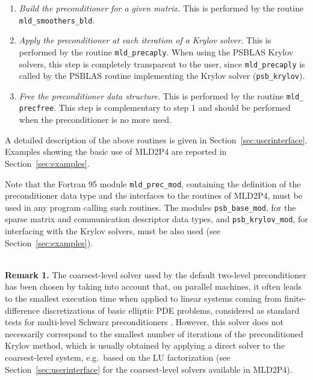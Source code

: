 \begin{enumerate}
{  preconditioner parameters.} This is performed by the routine \verb|mld_precset|.
  This routine must be called only if the user wants to modify the default values
  of the parameters associated to the selected preconditioner type, to obtain a variant
  of the preconditioner. Examples of use of \verb|mld_precset| are given in
  Section~\ref{sec:examples}; a complete list of all the
  preconditioner parameters and their allowed and default values is provided in 
  Section~\ref{sec:userinterface}, Tables~\ref{tab:p_type}-\ref{tab:p_coarse}. 
\item \emph{Build the preconditioner for a given matrix.} This is performed by
  the routine \verb|mld_smoothers_bld|.
\item \emph{Apply the preconditioner at each iteration of a Krylov solver.}
  This is performed by the routine \verb|mld_precaply|. When using the PSBLAS Krylov solvers,
  this step is completely transparent to the user, since \verb|mld_precaply| is called
  by the PSBLAS routine implementing the Krylov solver (\verb|psb_krylov|).
\item \emph{Free the preconditioner data structure}. This is performed by
  the routine \verb|mld_| \verb|precfree|. This step is complementary to step 1 and should
  be performed when the preconditioner is no more used.
\end{enumerate}
A detailed description of the above routines is given in Section~\ref{sec:userinterface}.
Examples showing the basic use of MLD2P4 are reported in Section~\ref{sec:examples}.

Note that the Fortran 95 module \verb|mld_prec_mod|, containing the definition of the 
preconditioner data type and the interfaces to the routines of MLD2P4,
must be used in any program calling such routines.
The modules \verb|psb_base_mod|, for the sparse matrix and communication descriptor
data types, and \verb|psb_krylov_mod|, for interfacing with the
Krylov solvers, must be also used (see Section~\ref{sec:examples}).

\ \\
\textbf{Remark 1.} The coarsest-level solver used by the default two-level
preconditioner has been chosen by taking into account that, on parallel
machines, it often leads to the smallest execution time when applied to
linear systems coming from finite-difference discretizations of basic
elliptic PDE problems, considered as standard tests for multi-level Schwarz
preconditioners \cite{aaecc_07,apnum_07}. However, this solver does
not necessarily correspond to the smallest number of iterations of the
preconditioned Krylov method, which is usually obtained by applying
a direct solver to the coarsest-level system, e.g.\ based on the LU
factorization (see Section~\ref{sec:userinterface}
for the coarsest-level solvers available in MLD2P4). 

